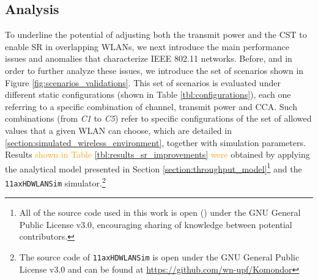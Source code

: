 \documentclass[preprint,12pt]{elsarticle}
\begin{document}
\subsection{Analysis}
\label{section:spatial_reuse_enhancement}  
To underline the potential of adjusting both the transmit power and the CST to enable SR in overlapping WLANs, we next introduce the main performance issues and anomalies that characterize IEEE 802.11 networks. Before, and in order to further analyze these issues, we introduce the set of scenarios shown in Figure \ref{fig:scenarios_validations}. This set of scenarios is evaluated under different static configurations (shown in Table \ref{tbl:configurations}), each one referring to a specific combination of channel, transmit power and CCA. Such combinations (from \emph{C1} to \emph{C5}) refer to specific configurations of the set of allowed values that a given WLAN can choose, which are detailed in \ref{section:simulated_wireless_environment}, together with simulation parameters. Results \textcolor{orange}{shown in Table \ref{tbl:results_sr_improvements} were} obtained by applying the analytical model presented in Section \ref{section:throughput_model}\footnote{All of the source code used in this work is open (\citealp{fwilhelmi2018code}) under the GNU General Public License v3.0, encouraging sharing of knowledge between potential contributors.} and the \texttt{11axHDWLANSim} simulator.\footnote{The source code of \texttt{11axHDWLANSim} is open under the GNU General Public License v3.0 and can be found at \url{https://github.com/wn-upf/Komondor}}
\end{document}
